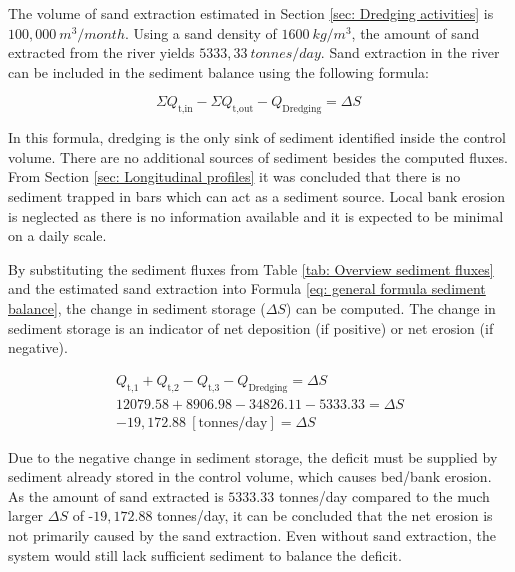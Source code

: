 The volume of sand extraction estimated in Section \ref{sec: Dredging activities} is $100,000~m^3/month$. Using a sand density of $1600~kg/m^3$, the amount of sand extracted from the river yields $5333,33~tonnes/day$. Sand extraction in the river can be included in the sediment balance using the following formula:

\begin{equation}
    \Sigma Q_\text{t,in}  - \Sigma Q_\text{t,out} - Q_\text{Dredging}  = \Delta S \
    \label{eq: general formula sediment balance}
\end{equation}

In this formula, dredging is the only sink of sediment identified inside the control volume. There are no additional sources of sediment besides the computed fluxes. From Section \ref{sec: Longitudinal profiles} it was concluded that there is no sediment trapped in bars which can act as a sediment source. Local bank erosion is neglected as there is no information available and it is expected to be minimal on a daily scale.

By substituting the sediment fluxes from Table \ref{tab: Overview sediment fluxes} and the estimated sand extraction into Formula \ref{eq: general formula sediment balance}, the 
change in sediment storage ($\Delta S$) can be computed. The change in sediment storage is an indicator of net deposition (if positive) or net erosion (if negative).

\begin{subequations}\label{eq:sediment_balance}
    \begin{gather}
        Q_\text{t,1} + Q_\text{t,2} - Q_\text{t,3} - Q_\text{Dredging} = \Delta S \label{eq:sediment_balance_a} \\
        12079.58 + 8906.98 - 34826.11 - 5333.33 = \Delta S \label{eq:sediment_balance_b} \\
        -19{,}172.88~[\text{tonnes/day}] = \Delta S
        \label{eq:sediment_balance_c}
    \end{gather}
\end{subequations}

Due to the negative change in sediment storage, the deficit must be supplied by sediment already stored in the control volume, which causes bed/bank erosion. As the amount of sand extracted is $5333.33$ tonnes/day compared to the much larger $\Delta S$ of -$19,172.88$ tonnes/day, it can be concluded that the net erosion is not primarily caused by the sand extraction. Even without sand extraction, the system would still lack sufficient sediment to balance the deficit.

